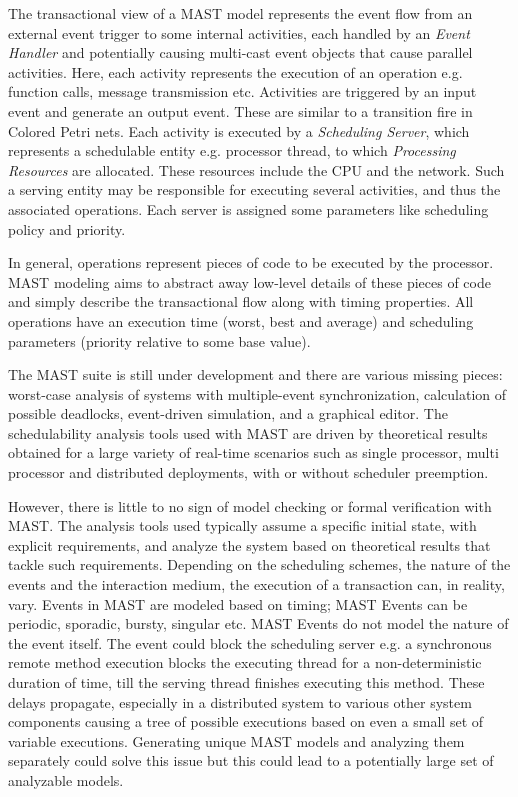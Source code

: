 The transactional view of a MAST model represents the event flow from an external event trigger to some internal activities, each handled by an \emph{Event Handler} and potentially causing multi-cast event objects that cause parallel activities. Here, each activity represents the execution of an operation e.g. function calls, message transmission etc. Activities are triggered by an input event and generate an output event. These are similar to a transition fire in Colored Petri nets. Each activity is executed by a \emph{Scheduling Server}, which represents a schedulable entity e.g. processor thread, to which \emph{Processing Resources} are allocated. These resources include the CPU and the network. Such a serving entity may be responsible for executing several activities, and thus the associated operations. Each server is assigned some parameters like scheduling policy and priority. 

In general, operations represent pieces of code to be executed by the processor. MAST modeling aims to abstract away low-level details of these pieces of code and simply describe the transactional flow along with timing properties. All operations have an execution time (worst, best and average) and scheduling parameters (priority relative to some base value).

The MAST suite is still under development and there are various missing pieces: worst-case analysis of systems with multiple-event synchronization, calculation of possible deadlocks, event-driven simulation, and a graphical editor. The schedulability analysis tools used with MAST are driven by theoretical results obtained for a large variety of real-time scenarios such as single processor, multi processor and distributed deployments, with or without scheduler preemption. 

However, there is little to no sign of model checking or formal verification with MAST. The analysis tools used typically assume a specific initial state, with explicit requirements, and analyze the system based on theoretical results that tackle such requirements. Depending on the scheduling schemes, the nature of the events and the interaction medium, the execution of a transaction can, in reality, vary. Events in MAST are modeled based on timing; MAST Events can be periodic, sporadic, bursty, singular etc. MAST Events do not model the nature of the event itself. The event could block the scheduling server e.g. a synchronous remote method execution blocks the executing thread for a non-deterministic duration of time, till the serving thread finishes executing this method. These delays propagate, especially in a distributed system to various other system components causing a tree of possible executions based on even a small set of variable executions. Generating unique MAST models and analyzing them separately could solve this issue but this could lead to a potentially large set of analyzable models. 

